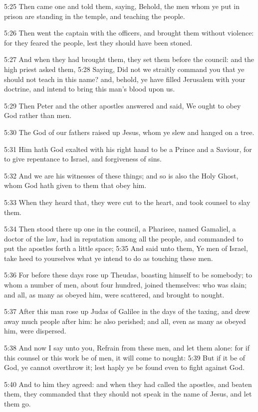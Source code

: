 5:25 Then came one and told them, saying, Behold, the men whom ye put in prison are standing in the temple, and teaching the people.

5:26 Then went the captain with the officers, and brought them without violence: for they feared the people, lest they should have been stoned.

5:27 And when they had brought them, they set them before the council: and the high priest asked them, 5:28 Saying, Did not we straitly command you that ye should not teach in this name? and, behold, ye have filled Jerusalem with your doctrine, and intend to bring this man's blood upon us.

5:29 Then Peter and the other apostles answered and said, We ought to obey God rather than men.

5:30 The God of our fathers raised up Jesus, whom ye slew and hanged on a tree.

5:31 Him hath God exalted with his right hand to be a Prince and a Saviour, for to give repentance to Israel, and forgiveness of sins.

5:32 And we are his witnesses of these things; and so is also the Holy Ghost, whom God hath given to them that obey him.

5:33 When they heard that, they were cut to the heart, and took counsel to slay them.

5:34 Then stood there up one in the council, a Pharisee, named Gamaliel, a doctor of the law, had in reputation among all the people, and commanded to put the apostles forth a little space; 5:35 And said unto them, Ye men of Israel, take heed to yourselves what ye intend to do as touching these men.

5:36 For before these days rose up Theudas, boasting himself to be somebody; to whom a number of men, about four hundred, joined themselves: who was slain; and all, as many as obeyed him, were scattered, and brought to nought.

5:37 After this man rose up Judas of Galilee in the days of the taxing, and drew away much people after him: he also perished; and all, even as many as obeyed him, were dispersed.

5:38 And now I say unto you, Refrain from these men, and let them alone: for if this counsel or this work be of men, it will come to nought: 5:39 But if it be of God, ye cannot overthrow it; lest haply ye be found even to fight against God.

5:40 And to him they agreed: and when they had called the apostles, and beaten them, they commanded that they should not speak in the name of Jesus, and let them go.

